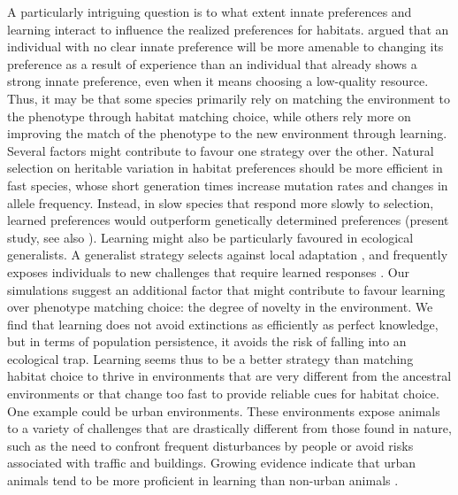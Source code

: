 A particularly intriguing question is to what extent innate
preferences and learning interact to influence the realized
preferences for habitats. \citet{Kawecki2010} argued that an individual
with no clear innate preference will be more amenable to
changing its preference as a result of experience than an individual
that already shows a strong innate preference, even
when it means choosing a low-quality resource. Thus, it
may be that some species primarily rely on matching the
environment to the phenotype through habitat matching
choice, while others rely more on improving the match of the
phenotype to the new environment through learning. Several
factors might contribute to favour one strategy over the other.
Natural selection on heritable variation in habitat preferences
should be more efficient in fast species, whose short generation
times increase mutation rates and changes in allele
frequency. Instead, in slow species that respond more
slowly to selection, learned preferences would outperform
genetically determined preferences (present study, see also \citet{Kokko2001}).
Learning might also be particularly favoured in ecological
generalists. A generalist strategy selects against local
adaptation \citep{Kisdi2002}, and frequently exposes individuals to new
challenges that require learned responses \citep{Sol2016a, Ducatez2015}. Our
simulations suggest an additional factor that might contribute to
favour learning over phenotype matching choice: the degree
of novelty in the environment. We find that learning does
not avoid extinctions as efficiently as perfect knowledge,
but in terms of population persistence, it avoids the risk of
falling into an ecological trap. Learning seems thus to be a
better strategy than matching habitat choice to thrive in
environments that are very different from the ancestral
environments or that change too fast to provide reliable
cues for habitat choice. One example could be urban environments.
These environments expose animals to a variety of
challenges that are drastically different from those found in
nature, such as the need to confront frequent disturbances
by people or avoid risks associated with traffic and buildings.
Growing evidence indicate that urban animals tend to be
more proficient in learning than non-urban animals \citep{Sol2013a}.

